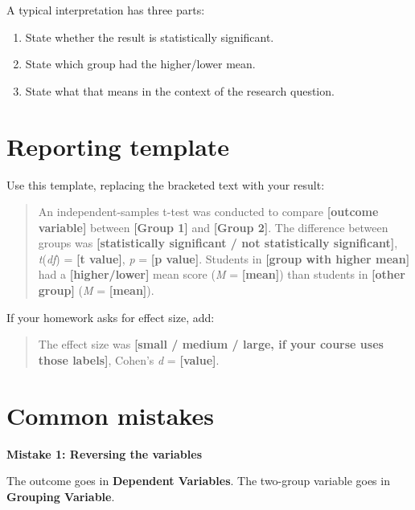 \documentclass[
  letterpaper,
  DIV=11,
  numbers=noendperiod]{scrreprt}
\providecommand{\tightlist}{%
  \setlength{\itemsep}{0pt}\setlength{\parskip}{0pt}}
\begin{document}
A typical interpretation has three parts:

\begin{enumerate}
\def\labelenumi{\arabic{enumi}.}
\tightlist
\item
  State whether the result is statistically significant.
\item
  State which group had the higher/lower mean.
\item
  State what that means in the context of the research question.
\end{enumerate}

\section{Reporting template}\label{reporting-template}

Use this template, replacing the bracketed text with your result:

\begin{quote}
An independent-samples t-test was conducted to compare
\textbf{{[}outcome variable{]}} between \textbf{{[}Group 1{]}} and
\textbf{{[}Group 2{]}}. The difference between groups was
\textbf{{[}statistically significant / not statistically
significant{]}}, \emph{t}(\emph{df}) = \textbf{{[}t value{]}}, \emph{p}
= \textbf{{[}p value{]}}. Students in \textbf{{[}group with higher
mean{]}} had a \textbf{{[}higher/lower{]}} mean score (\emph{M} =
\textbf{{[}mean{]}}) than students in \textbf{{[}other group{]}}
(\emph{M} = \textbf{{[}mean{]}}).
\end{quote}

If your homework asks for effect size, add:

\begin{quote}
The effect size was \textbf{{[}small / medium / large, if your course
uses those labels{]}}, Cohen's \emph{d} = \textbf{{[}value{]}}.
\end{quote}

\section{Common mistakes}\label{common-mistakes-5}

\begin{tcolorbox}[enhanced jigsaw, arc=.35mm, bottomrule=.15mm, breakable, colback=white, colframe=quarto-callout-warning-color-frame, left=2mm, leftrule=.75mm, opacityback=0, rightrule=.15mm, toprule=.15mm]
\begin{minipage}[t]{5.5mm}
\textcolor{quarto-callout-warning-color}{\faExclamationTriangle}
\end{minipage}%
\begin{minipage}[t]{\textwidth - 5.5mm}

\vspace{-3mm}\textbf{Mistake 1: Reversing the variables}\vspace{3mm}

The outcome goes in \textbf{Dependent Variables}. The two-group variable
goes in \textbf{Grouping Variable}.

\end{minipage}%
\end{tcolorbox}
\end{document}
